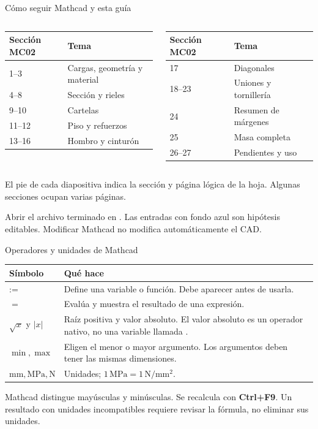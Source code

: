 \documentclass[10pt,aspectratio=169]{beamer}
\newcommand{\mc}[1]{\texttt{\detokenize{#1}}}
\newcommand{\mcref}{Guía de diseño}
\begin{document}
\gdef\mcref{Guía de diseño}
\begin{frame}[t]{Cómo seguir Mathcad y esta guía}

\small
\begin{columns}[T,onlytextwidth]
\begin{tabular}{ll}\toprule Sección MC02 & Tema\\\midrule
1--3 & Cargas, geometría y material\\
4--8 & Sección y rieles\\
9--10 & Cartelas\\
11--12 & Piso y refuerzos\\
13--16 & Hombro y cinturón\\\bottomrule\end{tabular}
\begin{tabular}{ll}\toprule Sección MC02 & Tema\\\midrule
17 & Diagonales\\
18--23 & Uniones y tornillería\\
24 & Resumen de márgenes\\
25 & Masa completa\\
26--27 & Pendientes y uso\\\bottomrule\end{tabular}
\end{columns}
\medskip
El pie de cada diapositiva indica la sección y página lógica de la hoja. Algunas secciones ocupan varias páginas.

Abrir el archivo terminado en \mc{EDITABLE.xmcd}. Las entradas con fondo azul son hipótesis editables. Modificar Mathcad no modifica automáticamente el CAD.

\end{frame}

\gdef\mcref{Mathcad: sección 27 / pág. 45}
\begin{frame}[t]{Operadores y unidades de Mathcad}

\begin{tabular}{p{}p{}}\toprule
Símbolo & Qué hace\\\midrule
$\texttt{:=}$ & Define una variable o función. Debe aparecer antes de usarla.\\
$=$ & Evalúa y muestra el resultado de una expresión.\\
$\sqrt{x}$ y $|x|$ & Raíz positiva y valor absoluto. El valor absoluto es un operador nativo, no una variable llamada \mc{abs}.\\
$\min,\max$ & Eligen el menor o mayor argumento. Los argumentos deben tener las mismas dimensiones.\\
$\mathrm{mm,MPa,N}$ & Unidades; $1\,\mathrm{MPa}=1\,\mathrm{N/mm^2}$.\\\bottomrule
\end{tabular}
\medskip
Mathcad distingue mayúsculas y minúsculas. Se recalcula con \textbf{Ctrl+F9}. Un resultado con unidades incompatibles requiere revisar la fórmula, no eliminar sus unidades.

\end{frame}
\end{document}
